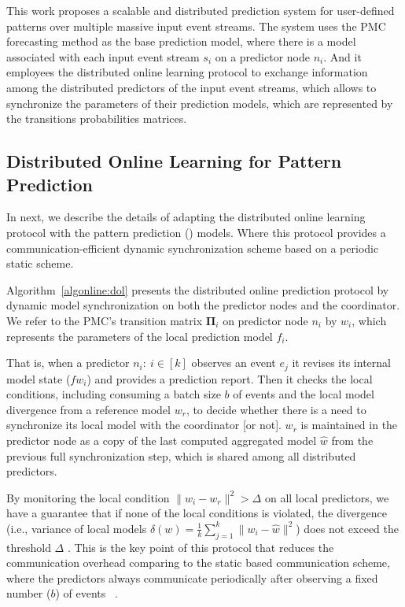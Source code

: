 \par This work proposes a scalable and distributed prediction system for user-defined patterns over multiple massive input event streams. The system  uses the PMC forecasting method \cite{alevizos2017event} as the base prediction model, where there is a \pmcmr model associated with each input event stream $s_i$ on a predictor node $n_i$. And it employees the distributed online learning protocol \cite{kamp2014communication} to exchange information among the distributed predictors of the input event streams, which allows to synchronize the parameters of their prediction models, which are represented by the transitions probabilities matrices.

%

\subsection*{Distributed Online Learning for Pattern Prediction}

\par In next, we describe the details of adapting the distributed online learning protocol \cite{kamp2014communication} with the pattern prediction (\pmcmr) models. Where this protocol provides a communication-efficient dynamic synchronization scheme based on a periodic static scheme.


\par Algorithm~\ref{algonline:dol} presents the distributed online prediction protocol by dynamic model synchronization on both the predictor nodes and the coordinator. We refer to the PMC's transition matrix $\boldsymbol{\Pi}_i$ on predictor node $n_i$ by $w_i$, which represents the parameters of the local prediction model $f_i$. 

\par That is, when a predictor $n_i:\ i \in[k]$ observes an event $e_j$ it revises its internal model state ($fw_i$) and provides a prediction report. Then it checks the local conditions, including consuming a batch size $b$ of events and the local model divergence from a reference model $w_r$, to decide whether there is a need to synchronize its local model with the coordinator [or not]. $w_r$ is maintained in the predictor node as a copy of the last computed aggregated model $\hat{w}$ from the previous full synchronization step, which is shared among all distributed predictors.

 \par By monitoring the local condition $\|w_i - w_r\|^2 > \Delta$ on all local predictors, we have a guarantee that if none of the local conditions is violated, the divergence (i.e., variance of local models $\delta(w)=\frac{1}{k} \sum_{j=1}^{k}\|w_i - \hat{w}\|^2$) does not exceed the threshold $\Delta$ \cite{kamp2014communication}. This is the key point of this protocol that reduces the communication overhead comparing to the static based communication scheme, where the predictors always communicate periodically after observing a fixed number ($b$) of events ~\cite{dekel2012optimal}.  

